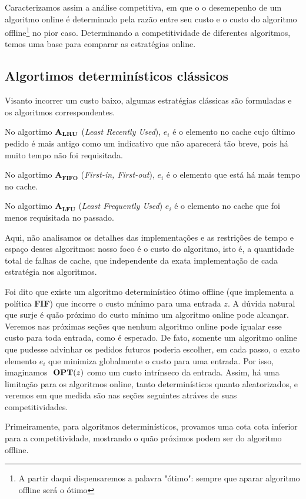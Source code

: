 Caracterizamos assim a análise competitiva, em que o o desemepenho de um algoritmo online é determinado pela razão entre seu custo e o custo do algoritmo offline\footnote{A partir daqui dispensaremos a palavra "ótimo": sempre que aparar algoritmo offline será o ótimo} no pior caso. Determinando a competitividade de diferentes algoritmos, temos uma base para comparar as estratégias online. 

\subsection{Algortimos determinísticos clássicos}

Visanto incorrer um custo baixo, algumas estratégias clássicas são formuladas e os algoritmos correspondentes.  

No algortimo \(\mathbf{A_{LRU}}\) (\textit{Least Recently Used}), \(e_i\) é o elemento no cache cujo último pedido é mais antigo como um indicativo que não aparecerá tão breve, pois há muito tempo não foi requisitada.

No algortimo \(\mathbf{A_{FIFO}}\) (\textit{First-in, First-out}), \(e_i\) é o elemento que está há mais tempo no cache. 

No algortimo \(\mathbf{A_{LFU}}\) (\textit{Least Frequently Used}) \(e_i\) é o elemento no cache que foi menos requisitada no passado.

Aqui, não analisamos os detalhes das implementações e as restrições de tempo e espaço desses algoritmos: nosso foco é o custo do algoritmo, isto é, a quantidade total de falhas de cache, que independente da exata implementação de cada estratégia nos algoritmos.

Foi dito que existe um algoritmo determinístico ótimo offline (que implementa a política \textbf{FIF}) que incorre o custo mínimo para uma entrada \(z\). A dúvida natural que surje é quão próximo do custo mínimo um algoritmo online pode alcançar. Veremos nas próximas seções que nenhum algoritmo online pode igualar esse custo para toda entrada, como é esperado. De fato, somente um algoritmo online que pudesse advinhar os pedidos futuros poderia escolher, em cada passo, o exato elemento \(e_i\) que minimiza globalmente o custo para uma entrada. Por isso, imaginamos \(\ \textbf{OPT}(z)\) como um custo intrínseco da entrada. Assim, há uma limitação para os algoritmos online, tanto determinísticos quanto aleatorizados, e veremos em que medida são nas seções seguintes atráves de suas competitividades.

Primeiramente, para algoritmos determinísticos, provamos uma cota cota inferior para a competitividade, mostrando o quão próximos podem ser do algoritmo offline. 

